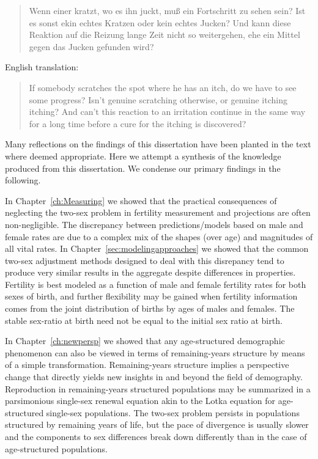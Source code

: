 \FloatBarrier
\label{sec:reflections}

\begin{singlespace}
\begin{quote}
Wenn einer kratzt, wo es ihn juckt, mu{\ss} ein Fortschritt zu sehen sein? Ist
es sonst ekin echtes Kratzen oder kein echtes Jucken? Und kann diese Reaktion
auf die Reizung lange Zeit nicht so weitergehen, ehe ein Mittel gegen das Jucken
gefunden wird?
\citep{wittgenstein1984culture}
\end{quote}

English translation:
\begin{quote}
 If somebody scratches the spot where he has an itch, do we have to see 
 some progress? Isn't genuine scratching otherwise, or genuine itching 
itching? And can't this reaction to an irritation continue in the 
same way for a long time before a cure for the itching is discovered?
\citep{wittgenstein1984culture}
\end{quote}
\end{singlespace}

Many reflections on the findings of this dissertation have been planted in the
text where deemed appropriate. Here we attempt a synthesis of the
knowledge produced from this dissertation. We condense our primary findings in
the following.

In Chapter~\ref{ch:Measuring} we showed that the practical consequences of
neglecting the two-sex problem in fertility measurement and projections are often non-negligible. The discrepancy between 
predictions/models based on male and female rates are
due to a complex mix of the shapes (over age) and magnitudes of all vital rates. 
In Chapter~\ref{sec:modelingapproaches} we showed that the common two-sex
adjustment methods designed to deal with this disrepancy tend to produce very
similar results in the aggregate despite differences in properties. Fertility is
best modeled as a function of male and female fertility rates for both sexes of
birth, and further flexibility may be gained when fertility information comes
from the joint distribution of births by ages of males and females. The stable
sex-ratio at birth need not be equal to the initial sex ratio at birth.

In Chapter~\ref{ch:newpersp} we showed that any age-structured demographic
phenomenon can also be viewed in terms of remaining-years structure by means of a simple 
transformation. Remaining-years structure implies a perspective
change that directly yields new insights in and beyond the field of demography.
Reproduction in remaining-years structured populations may be summarized in a
parsimonious single-sex renewal equation akin to the Lotka equation
for age-structured single-sex populations. The two-sex problem
persists in populations structured by remaining years of life, but the pace of
divergence is usually slower and the components to sex differences break down
differently than in the case of age-structured populations. 

